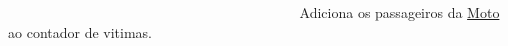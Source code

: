 ~\newline
~\newline
~\newline
~\newline
~\newline
~\newline
~\newline
~\newline
~\newline
~\newline
~\newline
~\newline
~\newline
~\newline
~\newline
~\newline
~\newline
~\newline
~\newline
~\newline
~\newline
~\newline
~\newline
~\newline
~\newline
 Adiciona os passageiros da \mbox{\hyperlink{class_moto}{Moto}} ao contador de vitimas.

